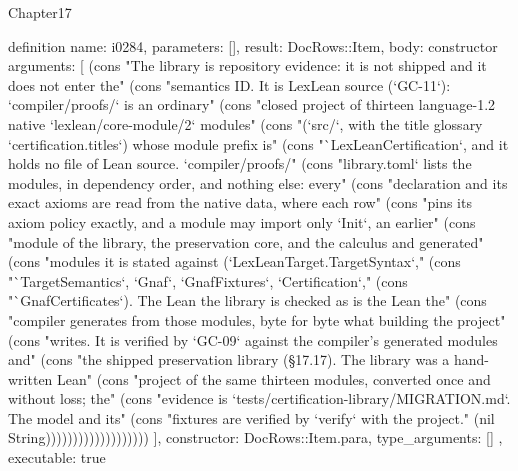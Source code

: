 \begin{lexlean}{Chapter17}
\begin{semanticmodule}
definition{
  name: i0284,
  parameters: [],
  result: DocRows::Item,
  body: constructor{
    arguments: [
      (cons "The library is repository evidence: it is not shipped and it does not enter the" (cons "semantics ID. It is LexLean source (`GC-11`): `compiler/proofs/` is an ordinary" (cons "closed project of thirteen language-1.2 native `lexlean/core-module/2` modules" (cons "(`src/`, with the title glossary `certification.titles`) whose module prefix is" (cons "`LexLeanCertification`, and it holds no file of Lean source. `compiler/proofs/" (cons "library.toml` lists the modules, in dependency order, and nothing else: every" (cons "declaration and its exact axioms are read from the native data, where each row" (cons "pins its axiom policy exactly, and a module may import only `Init`, an earlier" (cons "module of the library, the preservation core, and the calculus and generated" (cons "modules it is stated against (`LexLeanTarget.TargetSyntax`," (cons "`TargetSemantics`, `Gnaf`, `GnafFixtures`, `Certification`," (cons "`GnafCertificates`). The Lean the library is checked as is the Lean the" (cons "compiler generates from those modules, byte for byte what building the project" (cons "writes. It is verified by `GC-09` against the compiler's generated modules and" (cons "the shipped preservation library (§17.17). The library was a hand-written Lean" (cons "project of the same thirteen modules, converted once and without loss; the" (cons "evidence is `tests/certification-library/MIGRATION.md`. The model and its" (cons "fixtures are verified by `verify` with the project." (nil String)))))))))))))))))))
    ],
    constructor: DocRows::Item.para,
    type_arguments: []
  },
  executable: true
}


\end{semanticmodule}
\end{lexlean}
